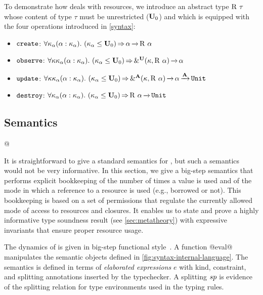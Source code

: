 To demonstrate how \lang{} deals with resources, we introduce an abstract
type $\tapp{\tres}{\tau}$ whose content of type $\tau$ must be
unrestricted ($\kun_0$) and which is equipped with the four
operations introduced in \cref{syntax}: 
\begin{itemize}[topsep=0pt]
\item
$\create$:
$\forall{\kvar_\tvar}\bvar{\tvar}{\kvar_\tvar}.\
\qual{\Cleq {\kvar_\tvar} {\kun_0}}
{\tvar \tarr{} \tapp\tres\tvar}$
\item
$\observe$:
$\forall{\kvar\kvar_\tvar}\bvar{\tvar}{\kvar_\tvar}.\
\qual{\Cleq {\kvar_\tvar} {\kun_0}}
{\borrowty[\IBORROW]{\kvar}{\tapp\tres\tvar} \tarr{} \tvar}$
\item
$\update$:
$\forall{\kvar\kvar_\tvar}\bvar{\tvar}{\kvar_\tvar}.\
\qual{\Cleq {\kvar_\tvar} {\kun_0}}
\borrowty[\MBORROW]{\kvar}{\tapp\tres\tvar} \tarr{} \tvar \tarr{\kaff} \tunit$
\item
$\destroy$:
$\forall{\kvar_\tvar}\bvar{\tvar}{\kvar_\tvar}.\
\qual{\Cleq {\kvar_\tvar} {\kun_0}}
\tapp\tres\tvar \tarr{} \tunit$
\end{itemize}

\subsection{Semantics}
\label{sec:sem}


\lstMakeShortInline[keepspaces,basicstyle=\normalsize\normalfont]@

It is straightforward to give a standard semantics for \lang, but such
a semantics would not be very informative. In this section, we give a
big-step semantics that performs explicit bookkeeping of the number of
times a value is used and of the mode in which a reference to a
resource is used (e.g., borrowed or not). This bookkeeping is based on a set of permissions
that regulate the currently allowed mode of access to resources and
closures. It enables us to state and prove a highly informative type
soundness result (see \cref{sec:metatheory}) with expressive invariants that ensure proper
resource usage.

The dynamics of \lang is given in big-step
functional
style~\cite{siek13:_type_safet_three_easy_lemmas,DBLP:conf/esop/OwensMKT16,
  DBLP:conf/popl/AminR17}.  A function
@eval@
manipulates the semantic objects defined in
\cref{fig:syntax-internal-language}.
%
The semantics is defined in terms of \emph{elaborated expressions} $e$
with kind, constraint, and splitting annotations inserted by the typechecker.
A splitting $\Sp$ is evidence of the splitting relation for type environments
used in the typing rules.

